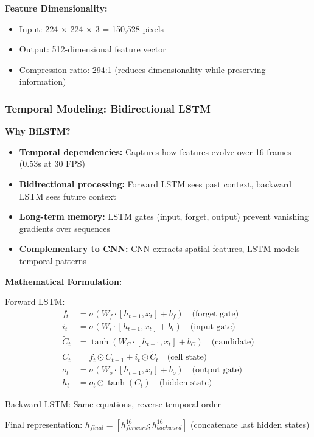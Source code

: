 \documentclass[11pt,a4paper]{article}
\begin{document}
\textbf{Feature Dimensionality:}
\begin{itemize}
\item Input: 224 $\times$ 224 $\times$ 3 = 150,528 pixels
\item Output: 512-dimensional feature vector
\item Compression ratio: 294:1 (reduces dimensionality while preserving information)
\end{itemize}

\subsubsection{Temporal Modeling: Bidirectional LSTM}

\textbf{Why BiLSTM?}

\begin{itemize}
\item \textbf{Temporal dependencies:} Captures how features evolve over 16 frames (0.53s at 30 FPS)
\item \textbf{Bidirectional processing:} Forward LSTM sees past context, backward LSTM sees future context
\item \textbf{Long-term memory:} LSTM gates (input, forget, output) prevent vanishing gradients over sequences
\item \textbf{Complementary to CNN:} CNN extracts spatial features, LSTM models temporal patterns
\end{itemize}

\textbf{Mathematical Formulation:}

Forward LSTM:
\begin{align}
f_t &= \sigma(W_f \cdot [h_{t-1}, x_t] + b_f) \quad \text{(forget gate)} \\
i_t &= \sigma(W_i \cdot [h_{t-1}, x_t] + b_i) \quad \text{(input gate)} \\
\tilde{C}_t &= \tanh(W_C \cdot [h_{t-1}, x_t] + b_C) \quad \text{(candidate)} \\
C_t &= f_t \odot C_{t-1} + i_t \odot \tilde{C}_t \quad \text{(cell state)} \\
o_t &= \sigma(W_o \cdot [h_{t-1}, x_t] + b_o) \quad \text{(output gate)} \\
h_t &= o_t \odot \tanh(C_t) \quad \text{(hidden state)}
\end{align}

Backward LSTM: Same equations, reverse temporal order

Final representation: $h_{final} = [h_{forward}^{16}; h_{backward}^{16}]$ (concatenate last hidden states)
\end{document}
